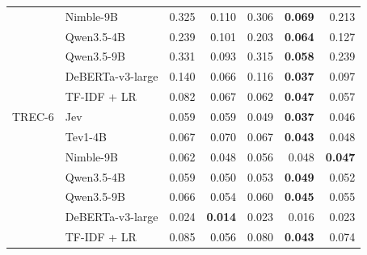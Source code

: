 \begin{tabular}{llrrrrr}
 & Nimble-9B & 0.325 & 0.110 & 0.306 & \textbf{0.069} & 0.213 \\
 & Qwen3.5-4B & 0.239 & 0.101 & 0.203 & \textbf{0.064} & 0.127 \\
 & Qwen3.5-9B & 0.331 & 0.093 & 0.315 & \textbf{0.058} & 0.239 \\
 & DeBERTa-v3-large & 0.140 & 0.066 & 0.116 & \textbf{0.037} & 0.097 \\
 & TF-IDF + LR & 0.082 & 0.067 & 0.062 & \textbf{0.047} & 0.057 \\
\midrule
TREC-6 & Jev & 0.059 & 0.059 & 0.049 & \textbf{0.037} & 0.046 \\
 & Tev1-4B & 0.067 & 0.070 & 0.067 & \textbf{0.043} & 0.048 \\
 & Nimble-9B & 0.062 & 0.048 & 0.056 & 0.048 & \textbf{0.047} \\
 & Qwen3.5-4B & 0.059 & 0.050 & 0.053 & \textbf{0.049} & 0.052 \\
 & Qwen3.5-9B & 0.066 & 0.054 & 0.060 & \textbf{0.045} & 0.055 \\
 & DeBERTa-v3-large & 0.024 & \textbf{0.014} & 0.023 & 0.016 & 0.023 \\
 & TF-IDF + LR & 0.085 & 0.056 & 0.080 & \textbf{0.043} & 0.074 \\
\bottomrule
\end{tabular}
